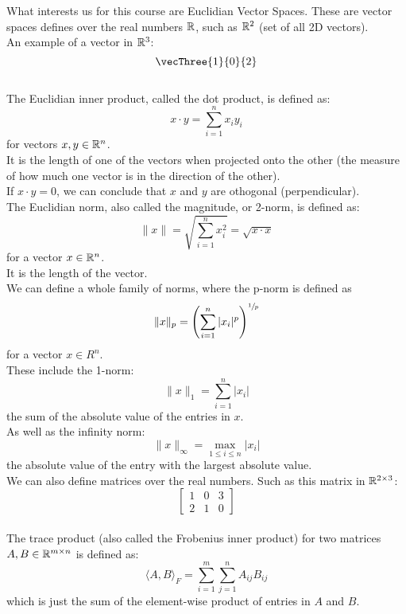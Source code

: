 \documentclass[12pt]{article}
\begin{document}
    What interests us for this course are
    Euclidian Vector Spaces.
    These are vector spaces defines over the real
    numbers $\mathbb{R}$, such as $\mathbb{R}^2$ (set of all 2D vectors). \\

    An example of a vector in $\mathbb{R}^3$:
    \[ \vecThree{1}{0}{2} \] \\

    The Euclidian inner product, called the dot product,
    is defined as:
    \[ x \cdot y = \sum_{i = 1}^nx_iy_i \]
    for vectors $x, y \in \mathbb{R}^n$. \\
    It is the length of one of the vectors when
    projected onto the other
    (the measure of how much one vector is in
    the direction of the other). \\
    If $x \cdot y = 0$,
    we can conclude that $x$ and $y$
    are othogonal (perpendicular). \\

    The Euclidian norm, also called the magnitude,
    or 2-norm,
    is defined as:
    \[ \|x\| = \sqrt{\sum_{i = 1}^nx_i^2} 
    = \sqrt{x \cdot x} \]
    for a vector $x \in \mathbb{R}^n$. \\
    It is the length of the vector. \\

    We can define a whole family of norms,
    where the p-norm is defined as
    \[ \| x \|_p = 
    \left( \sum_{i = 1}^n|x_i|^p  \right)^{\sfrac{1}{p}} \]
    for a vector $x \in R^n$. \\

    These include the 1-norm:
    \[ \| x \|_1 = \sum_{i = 1}^n|x_i| \]
    the sum of the absolute value of the entries in $x$. \\

    As well as the infinity norm:
    \[ \| x \|_\infty = \max_{1 \leq i \leq n} |x_i| \]
    the absolute value 
    of the entry with the largest absolute value. \\

    We can also define matrices over the real numbers.
    Such as this matrix in $\mathbb{R}^{2 \times 3}$:
    \[ \begin{bmatrix}
        1 & 0 & 3 \\
        2 & 1 & 0
    \end{bmatrix} \] \\

    The trace product
    (also called the Frobenius inner product)
    for two matrices
    $A, B \in \mathbb{R}^{m \times n}$ is defined as:
    \[ \langle A, B \rangle_F = 
    \sum_{i=1}^m\sum_{j=1}^n A_{ij}B_{ij} \]
    which is just the sum of the element-wise
    product of entries in $A$ and $B$. \\
\end{document}
